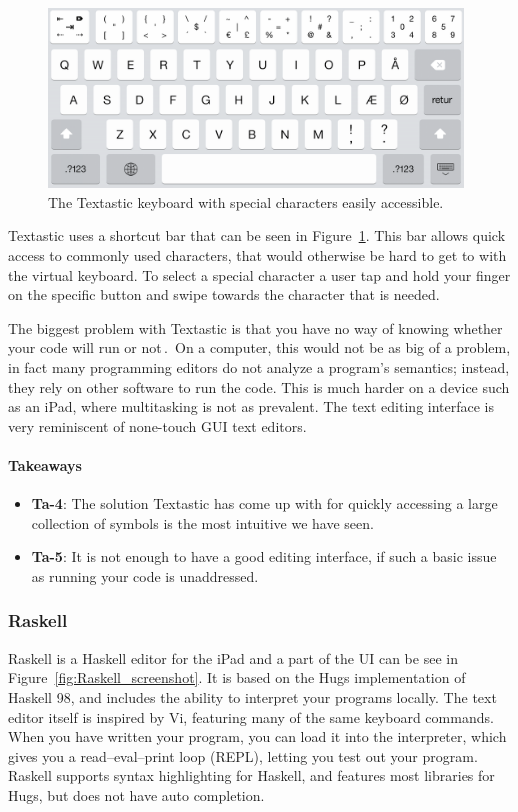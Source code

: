 \begin{figure}
	\centering
		\includegraphics[width=110mm]{diagrams/textastic_keyboard_screenshot.png}
	\caption{The Textastic keyboard with special characters easily accessible.}
\label{fig:textastic_keyboard_screenshot}
\end{figure}

Textastic uses a shortcut bar that can be seen in Figure~\ref{fig:textastic_keyboard_screenshot}. This bar allows quick access to commonly used characters, that would otherwise be hard to get to with the virtual keyboard. To select a special character a user tap and hold your finger on the specific button and swipe towards the character that is needed. 

The biggest problem with Textastic is that you have no way of knowing whether your code will run or not\,\cite{nielsen1990heuristic}.\ On a computer, this would not be as big of a problem, in fact many programming editors do not analyze a program's semantics; instead, they rely on other software to run the code. This is much harder on a device such as an iPad, where multitasking is not as prevalent. The text editing interface is very reminiscent of none-touch GUI text editors.

\paragraph{Takeaways}
\begin{itemize}
	\item \textbf{Ta-4}: The solution Textastic has come up with for quickly accessing a large collection of symbols is the most intuitive we have seen.
	\item \textbf{Ta-5}: It is not enough to have a good editing interface, if such a basic issue as running your code is unaddressed.
\end{itemize}


\subsubsection{Raskell}
\label{subsub:Raskell}
Raskell is a Haskell editor for the iPad and a part of the UI can be see in Figure~\ref{fig:Raskell_screenshot}. It is based on the Hugs implementation of Haskell 98, and includes the ability to interpret your programs locally. The text editor itself is inspired by Vi, featuring many of the same keyboard commands. When you have written your program, you can load it into the interpreter, which gives you a read–eval–print loop (REPL), letting you test out your program. Raskell supports syntax highlighting for Haskell, and features most libraries for Hugs, but does not have auto completion.

